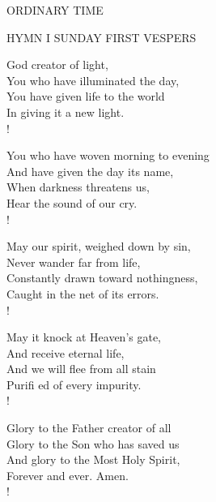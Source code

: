 \begin{center}\normalsize ORDINARY TIME\\
\end{center}

\noindent\small{\uppercase{Hymn I SUNDAY First Vespers}}\normalsize\label{ordinaryTime:firstHymn}
\begin{cverse}
God creator of light,\\
You who have illuminated the day,\\
You have given life to the world\\
In giving it a new light.\\!

You who have woven morning to evening\\
And have given the day its name,\\
When darkness threatens us,\\
Hear the sound of our cry.\\!

May our spirit, weighed down by sin,\\
Never wander far from life,\\
Constantly drawn toward nothingness,\\
Caught in the net of its errors.\\!

May it knock at Heaven’s gate,\\
And receive eternal life,\\
And we will flee from all stain\\
Purifi ed of every impurity.\\!

Glory to the Father creator of all\\
Glory to the Son who has saved us\\
And glory to the Most Holy Spirit,\\
Forever and ever. Amen.\\!
\end{cverse}

